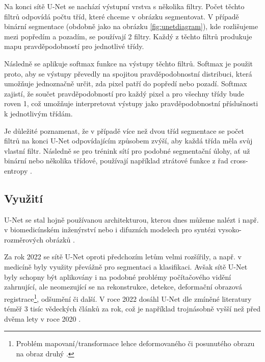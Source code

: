 Na konci sítě U-Net se nachází výstupní vrstva s několika filtry. Počet těchto filtrů odpovídá počtu tříd, které chceme v obrázku segmentovat. V případě binární segmentace (obdobně jako na obrázku \ref{fig:unetdiagram}), kde rozlišujeme mezi popředím a pozadím, se používají 2 filtry. Každý z těchto filtrů produkuje mapu pravděpodobností pro jednotlivé třídy.

Následně se aplikuje softmax funkce na výstupy těchto filtrů. Softmax je použit proto, aby se výstupy převedly na spojitou pravděpodobnostní distribuci, která umožňuje jednoznačně určit, zda pixel patří do popředí nebo pozadí. Softmax zajistí, že součet pravděpodobností pro každý pixel a pro všechny třídy bude roven 1, což umožňuje interpretovat výstupy jako pravděpodobnostní příslušnosti k jednotlivým třídám.

Je důležité poznamenat, že v případě více než dvou tříd segmentace se počet filtrů na konci U-Net odpovídajícím způsobem zvýší, aby každá třída měla svůj vlastní filtr. Následně se pro trénink sítí pro podobné segmentační úlohy, ať už binární nebo několika třídové, používají například ztrátové funkce z řad cross-entropy \cite{unet}.

\subsection{Využití}
\label{subsec:Chapter223}

U-Net se stal hojně používanou architekturou, kterou dnes můžeme nalézt i např. v biomedicínském inženýrství \cite{unet_success} nebo i difuzních modelech pro syntézi vysoko-rozměrových obrázků \cite{stablediffusion}.

Za rok 2022 se sítě U-Net oproti předchozím letům velmi rozšířily, a např. v medicíně byly využity převážně pro segmentaci a klasifikaci. Avšak sítě U-Net byly schopny být aplikovány i na podobné problémy počítačového vidění zahrnující, ale neomezující se na rekonstrukce, detekce, deformační obrazová registrace\footnote{Problém mapovaní/transformace lehce deformovaného či posunutého obrazu na obraz druhý \cite{unet_registration}.}, odšumění či další. V roce 2022 dosáhl U-Net dle zmíněné literatury téměř 3 tisíc vědeckých článků za rok, což je například trojnásobně vyšší než před dvěma lety v roce 2020 \cite{unet_success}.

\endinput